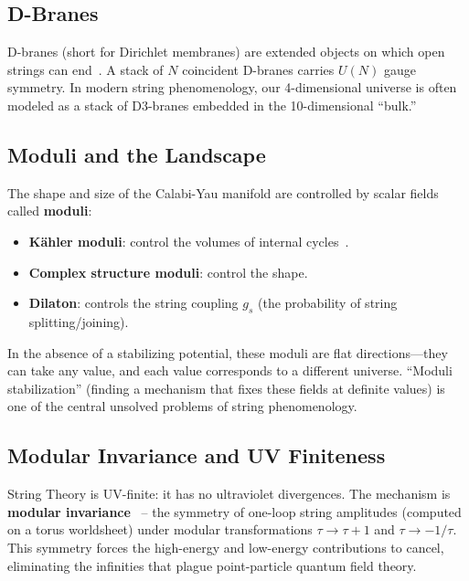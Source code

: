 \documentclass[11pt,a4paper]{article}
\theoremstyle{definition}
\newcommand{\gs}{g_s}
\begin{document}
\subsection{D-Branes}

D-branes (short for Dirichlet membranes) are extended objects on which
open strings can end~\cite{Polchinski1998v2}.  A stack of $N$ coincident D-branes carries $U(N)$
gauge symmetry.  In modern string phenomenology, our 4-dimensional
universe is often modeled as a stack of D3-branes embedded in the
10-dimensional ``bulk.''

\subsection{Moduli and the Landscape}

The shape and size of the Calabi-Yau manifold are controlled by scalar
fields called \textbf{moduli}:
\begin{itemize}[nosep]
    \item \textbf{K\"ahler moduli}: control the volumes of internal cycles~\cite{Polchinski1998v1}.
    \item \textbf{Complex structure moduli}: control the shape.
    \item \textbf{Dilaton}: controls the string coupling $\gs$ (the
          probability of string splitting/joining).
\end{itemize}
In the absence of a stabilizing potential, these moduli are flat
directions---they can take any value, and each value corresponds to a
different universe.  ``Moduli stabilization'' (finding a mechanism that
fixes these fields at definite values) is one of the central unsolved
problems of string phenomenology.

\subsection{Modular Invariance and UV Finiteness}

String Theory is UV-finite: it has no ultraviolet divergences.  The
mechanism is \textbf{modular invariance}~\cite{Polchinski1998v1} -- the symmetry of one-loop
string amplitudes (computed on a torus worldsheet) under modular
transformations $\tau \to \tau+1$ and $\tau \to -1/\tau$.  This symmetry
forces the high-energy and low-energy contributions to cancel, eliminating
the infinities that plague point-particle quantum field theory.


\end{document}
